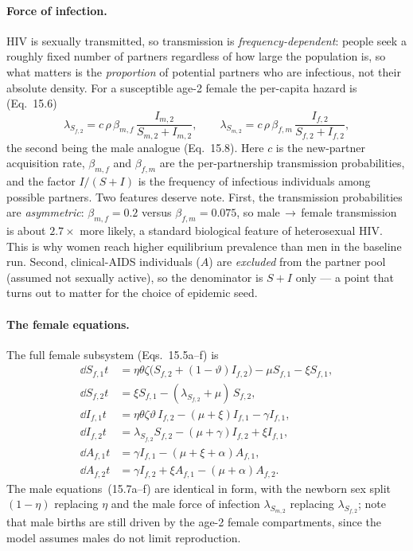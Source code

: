 \paragraph{Force of infection.}
HIV is sexually transmitted, so transmission is \emph{frequency-dependent}: people
seek a roughly fixed number of partners regardless of how large the population is,
so what matters is the \emph{proportion} of potential partners who are infectious,
not their absolute density. For a susceptible age-2 female the per-capita hazard is
(Eq.~15.6)
\begin{equation}
\lambda_{S_{f,2}} = c\,\rho\,\beta_{m,f}\,\frac{I_{m,2}}{S_{m,2}+I_{m,2}},
\qquad
\lambda_{S_{m,2}} = c\,\rho\,\beta_{f,m}\,\frac{I_{f,2}}{S_{f,2}+I_{f,2}},
\label{eq:foi}
\end{equation}
the second being the male analogue (Eq.~15.8). Here $c$ is the new-partner
acquisition rate, $\beta_{m,f}$ and $\beta_{f,m}$ are the per-partnership
transmission probabilities, and the factor $I/(S+I)$ is the frequency of
infectious individuals among possible partners. Two features deserve note. First,
the transmission probabilities are \emph{asymmetric}: $\beta_{m,f}=0.2$ versus
$\beta_{f,m}=0.075$, so male\,$\to$\,female transmission is about $2.7\times$ more
likely, a standard biological feature of heterosexual HIV. This is why women reach
higher equilibrium prevalence than men in the baseline run. Second, clinical-AIDS
individuals ($A$) are \emph{excluded} from the partner pool (assumed not sexually
active), so the denominator is $S+I$ only --- a point that turns out to matter for
the choice of epidemic seed.

\paragraph{The female equations.}
The full female subsystem (Eqs.~15.5a--f) is
\begin{align}
\dd{S_{f,1}}{t} &= \eta\theta\zeta\bigl(S_{f,2}+(1-\vartheta)I_{f,2}\bigr)
                   - \mu S_{f,1} - \xi S_{f,1}, \label{eq:Sf1}\\
\dd{S_{f,2}}{t} &= \xi S_{f,1} - (\lambda_{S_{f,2}}+\mu)\,S_{f,2}, \label{eq:Sf2}\\
\dd{I_{f,1}}{t} &= \eta\theta\zeta\vartheta\,I_{f,2}
                   - (\mu+\xi)I_{f,1} - \gamma I_{f,1}, \label{eq:If1}\\
\dd{I_{f,2}}{t} &= \lambda_{S_{f,2}} S_{f,2}
                   - (\mu+\gamma)I_{f,2} + \xi I_{f,1}, \label{eq:If2}\\
\dd{A_{f,1}}{t} &= \gamma I_{f,1} - (\mu+\xi+\alpha)A_{f,1}, \label{eq:Af1}\\
\dd{A_{f,2}}{t} &= \gamma I_{f,2} + \xi A_{f,1} - (\mu+\alpha)A_{f,2}. \label{eq:Af2}
\end{align}
The male equations~(15.7a--f) are identical in form, with the newborn sex split
$(1-\eta)$ replacing $\eta$ and the male force of infection
$\lambda_{S_{m,2}}$ replacing $\lambda_{S_{f,2}}$; note that male births are still
driven by the age-2 female compartments, since the model assumes males do not limit
reproduction.

